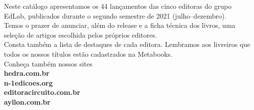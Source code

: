 \hspace*{-.5cm}\parbox{180pt}{\raggedright 
Neste catálogo apresentamos os 44 lançamentos das cinco editoras do grupo EdLab, publicados durante o segundo semestre de 2021 (julho--dezembro).\\
\smallskip
Temos o prazer de anunciar, além do release e a ficha técnica dos livros, uma seleção de artigos escolhida pelos próprios editores.\\
\smallskip
Consta também a lista de destaques de cada editora. Lembramos aos livreiros que todos os nossos títulos estão cadastrados na Metabooks.\\
\bigskip
Conheça também nossos sites\\
\textbf{hedra.com.br}\\
\textbf{n-1edicoes.org}\\
\textbf{editoracircuito.com.br}\\
\textbf{ayllon.com.br}
}

\pagebreak

